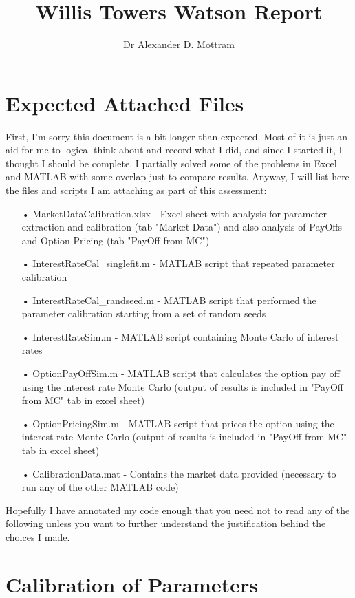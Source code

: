 \documentclass[10pt,a4paper]{article}
\author{Dr Alexander D. Mottram}
\title{Willis Towers Watson Report}
\theoremstyle{definition}
\theoremstyle{plain}
\theoremstyle{definition}
\theoremstyle{plain}
\begin{document}
\maketitle

\section{Expected Attached Files}

First, I'm sorry this document is a bit longer than expected. Most of it is just an aid for me to logical think about and record what I did, and since I started it, I thought I should be complete. I partially solved some of the problems in Excel and MATLAB with some overlap just to compare results. Anyway, I will list here the files and scripts I am attaching as part of this assessment:

\begin{itemize}
\item[•] MarketDataCalibration.xlsx - Excel sheet with analysis for parameter extraction and calibration (tab "Market Data") and also analysis of PayOffs and Option Pricing (tab "PayOff from MC")
\item[•] InterestRateCal\_singlefit.m - MATLAB script that repeated parameter calibration
\item[•] InterestRateCal\_randseed.m - MATLAB script that performed the parameter calibration starting from a set of random seeds
\item[•] InterestRateSim.m - MATLAB script containing Monte Carlo of interest rates
\item[•] OptionPayOffSim.m - MATLAB script that calculates the option pay off using the interest rate Monte Carlo (output of results is included in "PayOff from MC" tab in excel sheet)
\item[•] OptionPricingSim.m - MATLAB script that prices the option using the interest rate Monte Carlo (output of results is included in "PayOff from MC" tab in excel sheet)
\item[•] CalibrationData.mat - Contains the market data provided (necessary to run any of the other MATLAB code)
\end{itemize}

Hopefully I have annotated my code enough that you need not to read any of the following unless you want to further understand the justification behind the choices I made.

\section{Calibration of Parameters}
\end{document}
